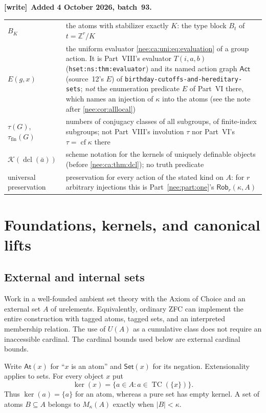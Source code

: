 \documentclass[11pt,letterpaper]{article}
\numberwithin{equation}{section}
\theoremstyle{plain}
\theoremstyle{definition}
\theoremstyle{remark}
\newcommand{\At}{\mathsf{At}}
\newcommand{\Set}{\mathsf{Set}}
\newcommand{\cf}{\operatorname{cf}}
\newcommand{\kerat}{\operatorname{ker}}
\newcommand{\TC}{\operatorname{TC}}
\newcommand{\Mk}{M_\kappa(A)}
\newcommand{\ZZ}{\mathbb Z}
\newcommand{\dcl}{\operatorname{dcl}}
\newenvironment{writenote}[1][]{\par\smallskip\begingroup\small\raggedright
 \setlength{\parindent}{1.25em}\noindent\textbf{[write]}\if\relax\detokenize{#1}\relax\else~\textbf{#1.}\fi\ }%
 {\par\endgroup\smallskip}
\begin{document}
\begin{writenote}[Added 4 October 2026, batch~93]
\begin{center}
\begin{tabular}{>{\raggedright\arraybackslash}p{}>{\raggedright\arraybackslash}p{}}
$B_K$ & the atoms with stabilizer exactly $K$: the type block $B_t$ of $t=\ZZ^r/K$\\
$E(g,x)$ & the uniform evaluator \eqref{nee:ca:uni:eq:evaluation} of a group action. It is Part~VIII's evaluator $T(i,a,b)$ (\texttt{hset:ns:thm:evaluator}) and its named action graph $\mathsf{Act}$ (source~12's $E$) of \nolinkurl{birthday-cutoffs-and-hereditary-sets}; \emph{not} the enumeration predicate $E$ of Part~VI there, which names an injection of $\kappa$ into the atoms (see the note after \cref{nee:cor:alllocal})\\
$\tau(G)$, $\tau_{\mathrm{fin}}(G)$ & numbers of conjugacy classes of all subgroups, of finite-index subgroups; not Part~VIII's involution $\tau$ nor Part~VI's $\tau=\cf\kappa$ there\\
$\mathcal K(\dcl(\bar a))$ & scheme notation for the kernels of uniquely definable objects (before \cref{nee:ca:thm:dcl}); no truth predicate\\
universal preservation & preservation for every action of the stated kind on $A$: for $r$ arbitrary injections this is Part~\ref{nee:part:one}'s $\mathsf{Rob}_r(\kappa,A)$\\
\bottomrule
\end{tabular}
\end{center}
\end{writenote}

\section{Foundations, kernels, and canonical lifts}\label{nee:ca:sec:foundations}

\subsection{External and internal sets}

Work in a well-founded ambient set theory with the Axiom of Choice and an external set $A$ of urelements. Equivalently, ordinary ZFC can implement the entire construction with tagged atoms, tagged sets, and an interpreted membership relation. The use of $U(A)$ as a cumulative class does not require an inaccessible cardinal. The cardinal bounds used below are external cardinal bounds.

Write $\At(x)$ for ``$x$ is an atom'' and $\Set(x)$ for its negation. Extensionality applies to sets. For every object $x$ put
\[
\kerat(x)=\{a\in A:a\in\TC(\{x\})\}.
\]
Thus $\kerat(a)=\{a\}$ for an atom, whereas a pure set has empty kernel. A set of atoms $B\subseteq A$ belongs to $\Mk$ exactly when $|B|<\kappa$.
\end{document}
